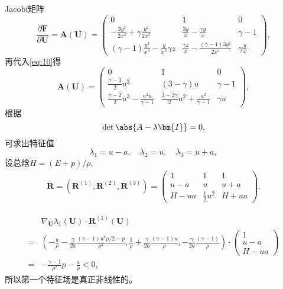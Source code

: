 \documentclass[12pt]{article}
\begin{document}
Jacobi矩阵
\begin{equation}
	\frac{\partial \bm{F}}{\partial \bm{U}}=\boldsymbol{A}(\boldsymbol{U})=\left(\begin{array}{ccc}
	0 & 1 & 0 \\
	-\frac{3y^2}{2x^2} + \gamma \frac{y^2}{2x^2} & \frac{3y}{x} - \frac{\gamma y}{x} & \gamma-1 \\
	(\gamma-1)\frac{y^3}{x^3} -\frac{y}{x^2}\gamma z & \frac{\gamma z}{x} - \frac{(\gamma -1)3y^2}{2x^2} & \gamma \frac{y}{x}
	\end{array}\right),
\end{equation}
再代入\cref{eq:10}得
\begin{equation}
	\boldsymbol{A}(\boldsymbol{U})=\left(\begin{array}{ccc}
	0 & 1 & 0 \\
	\frac{\gamma-3}{2} u^{2} & (3-\gamma) u & \gamma-1 \\
	\frac{\gamma-2}{2} u^{3}-\frac{a^{2} u}{\gamma-1} & \frac{3-2 \gamma}{2} u^{2}+\frac{a^{2}}{\gamma-1} & \gamma u
	\end{array}\right),
\end{equation}
根据
\begin{equation}
	\det{\abs{A-\lambda \bm{I}}} = 0,
\end{equation}
可求出特征值
\begin{equation}
	\lambda_{1} = {u}-a, \quad \lambda_{2}=u, \quad \lambda_{3}=u+a,
\end{equation}
设总焓$H=(E+p) / \rho,$
\begin{equation}
	\begin{array}{c}
	\boldsymbol{R}=\left(\boldsymbol{R}^{(1)}, \boldsymbol{R}^{(2)}, \boldsymbol{R}^{(3)}\right)=\left(\begin{array}{ccc}
	1 & 1 & 1 \\
	u-a & u & u+a \\
	H-u a & \frac{1}{2} u^{2} & H+u a
	\end{array}\right).
	\end{array}
\end{equation}

\begin{align}
	&\nabla_{\boldsymbol{U}} \lambda_{1}(\boldsymbol{U}) \cdot \boldsymbol{R}^{(1)}(\boldsymbol{U}) \\
	=& \left(-\frac{u}{\rho}-\frac{\gamma}{2a} \frac{(\gamma-1)u^2\rho/2-p}{\rho^2},\frac{1}{\rho}+\frac{\gamma}{2a}\frac{(\gamma-1)u}{\rho},-\frac{\gamma}{2a}\frac{(\gamma-1)}{\rho}\right)\cdot \begin{pmatrix}
		1\\u-a\\H-ua
	\end{pmatrix}\\
	=&-\frac{\gamma-1}{\rho^2}p-\frac{a}{\rho}<0,
\end{align}
所以第一个特征场是真正非线性的。
\end{document}
